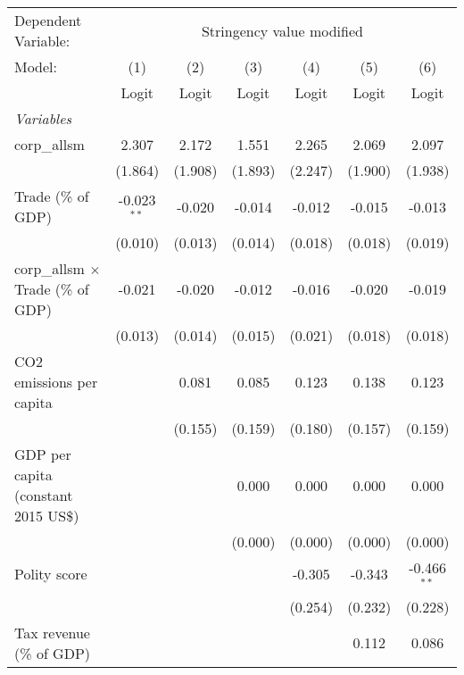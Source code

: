 
\begingroup
\centering
\begin{tabular}{lcccccc}
   \toprule
   Dependent Variable: & \multicolumn{6}{c}{Stringency value modified}\\
   Model:                                    & (1)           & (2)     & (3)     & (4)     & (5)     & (6)\\  
                                             &  Logit        & Logit   & Logit   & Logit   & Logit   & Logit\\  
   \midrule
   \emph{Variables}\\
   corp\_allsm                               & 2.307         & 2.172   & 1.551   & 2.265   & 2.069   & 2.097\\   
                                             & (1.864)       & (1.908) & (1.893) & (2.247) & (1.900) & (1.938)\\   
   Trade (\% of GDP)                         & -0.023$^{**}$ & -0.020  & -0.014  & -0.012  & -0.015  & -0.013\\   
                                             & (0.010)       & (0.013) & (0.014) & (0.018) & (0.018) & (0.019)\\   
   corp\_allsm $\times$ Trade (\% of GDP)    & -0.021        & -0.020  & -0.012  & -0.016  & -0.020  & -0.019\\   
                                             & (0.013)       & (0.014) & (0.015) & (0.021) & (0.018) & (0.018)\\   
   CO2 emissions per capita                  &               & 0.081   & 0.085   & 0.123   & 0.138   & 0.123\\   
                                             &               & (0.155) & (0.159) & (0.180) & (0.157) & (0.159)\\   
   GDP per capita (constant 2015 US\$)       &               &         & 0.000   & 0.000   & 0.000   & 0.000\\   
                                             &               &         & (0.000) & (0.000) & (0.000) & (0.000)\\   
   Polity score                              &               &         &         & -0.305  & -0.343  & -0.466$^{**}$\\   
                                             &               &         &         & (0.254) & (0.232) & (0.228)\\   
   Tax revenue (\% of GDP)                   &               &         &         &         & 0.112   & 0.086\\   

\end{tabular}
